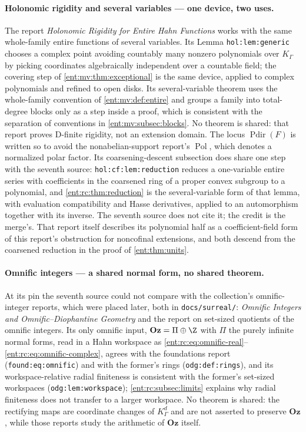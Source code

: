 \documentclass[11pt]{article}
\theoremstyle{plain}
\theoremstyle{plain}
\theoremstyle{plain}
\theoremstyle{definition}
\theoremstyle{definition}
\theoremstyle{definition}
\theoremstyle{definition}
\theoremstyle{remark}
\newcommand{\K}{K_\Gamma}\newcommand{\KD}{K_\Delta}
\DeclareMathOperator{\Pdir}{Pdir}\DeclareMathOperator{\Adm}{Adm}
\newcommand{\Oz}{\mathbf{Oz}}\newcommand{\Ed}{\mathcal E_{\Gamma,d}}
\begin{document}
\paragraph{Holonomic rigidity and several variables --- one device, two
uses.}
The report \emph{Holonomic Rigidity for Entire Hahn Functions}
\cite{RepoHolonomic} works with the same whole-family entire functions of
several variables. Its Lemma \texttt{hol:lem:generic} chooses a complex point
avoiding countably many nonzero polynomials over $\K$ by picking coordinates
algebraically independent over a countable field; the covering step of
\cref{ent:mv:thm:exceptional} is the same device, applied to complex
polynomials and refined to open disks. Its several-variable theorem uses the
whole-family convention of \cref{ent:mv:def:entire} and groups a family into
total-degree blocks only as a step inside a proof, which is consistent with
the separation of conventions in \cref{ent:mv:subsec:blocks}. No theorem is
shared: that report proves D-finite rigidity, not an extension domain. The
locus $\Pdir(F)$ is written so to avoid the nonabelian-support report's
$\operatorname{Pol}$, which denotes a normalized polar factor.
Its coarsening-descent subsection does share one step with the seventh
source: \texttt{hol:cf:lem:reduction} reduces a one-variable entire series with
coefficients in the coarsened ring of a proper convex subgroup to a
polynomial, and \cref{ent:rc:thm:reduction} is the several-variable form of
that lemma, with evaluation compatibility and Hasse derivatives, applied to
an automorphism together with its inverse. The seventh source does not cite
it; the credit is the merge's. That report itself describes its polynomial
half as a coefficient-field form of this report's obstruction for noncofinal
extensions, and both descend from the coarsened reduction in the proof of
\cref{ent:thm:units}.

\paragraph{Omnific integers --- a shared normal form, no shared theorem.}
At its pin the seventh source could not compare with the collection's
omnific-integer reports, which were placed later, both in
\texttt{docs/surreal/}: \emph{Omnific Integers and Omnific--Diophantine
Geometry} and the report on set-sized quotients of the omnific integers. Its
only omnific input, $\Oz=\Pi\oplus\Z$ with $\Pi$ the purely infinite normal
forms, read in a Hahn workspace as
\eqref{ent:rc:eq:omnific-real}--\eqref{ent:rc:eq:omnific-complex}, agrees with
the foundations report (\texttt{found:eq:omnific}) and with the former's
rings (\texttt{odg:def:rings}), and its workspace-relative radial finiteness
is consistent with the former's set-sized workspaces
(\texttt{odg:lem:workspace}); \cref{ent:rc:subsec:limits} explains why radial
finiteness does not transfer to a larger workspace. No theorem is shared: the
rectifying maps are coordinate changes of $\K^d$ and are not asserted to
preserve $\Oz$, while those reports study the arithmetic of $\Oz$ itself.
\end{document}
